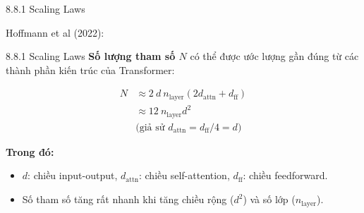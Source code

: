 \begin{frame}{8.8.1 Scaling Laws}
	
	Hoffmann et al (2022):
	
	\vspace{0.2cm}
	
	\renewcommand{\arraystretch}{1.2}
\end{frame}

\begin{frame}{8.8.1 Scaling Laws}
	\textbf{Số lượng tham số $N$} có thể được ước lượng gần đúng từ các thành phần kiến trúc của Transformer:

	\begin{align*}
		N &\approx 2\ d\ n_{\text{layer}}(2 d_{\text{attn}} + d_{\text{ff}}) \\
		&\approx 12\ n_{\text{layer}} d^2 \tag{8.52} \\
		&\text{(giả sử } d_{\text{attn}} = d_{\text{ff}}/4 = d\text{)}
	\end{align*}

	
	\vspace{1em}
	\textbf{Trong đó:} 
	\begin{itemize}
		\item $d$: chiều input-output, $d_{\text{attn}}$: chiều self-attention, $d_{\text{ff}}$: chiều feedforward.
		\item Số tham số tăng rất nhanh khi tăng chiều rộng ($d^2$) và số lớp ($n_{\text{layer}}$).
	\end{itemize}
\end{frame}

